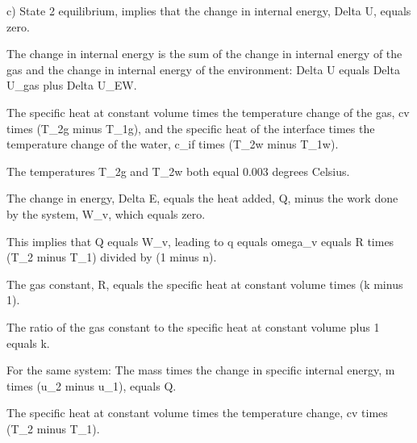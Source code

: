 c) State 2 equilibrium, implies that the change in internal energy, Delta U, equals zero.

The change in internal energy is the sum of the change in internal energy of the gas and the change in internal energy of the environment:
Delta U equals Delta U_gas plus Delta U_EW.

The specific heat at constant volume times the temperature change of the gas, cv times (T_2g minus T_1g), and the specific heat of the interface times the temperature change of the water, c_if times (T_2w minus T_1w).

The temperatures T_2g and T_2w both equal 0.003 degrees Celsius.

The change in energy, Delta E, equals the heat added, Q, minus the work done by the system, W_v, which equals zero.

This implies that Q equals W_v, leading to q equals omega_v equals R times (T_2 minus T_1) divided by (1 minus n).

The gas constant, R, equals the specific heat at constant volume times (k minus 1).

The ratio of the gas constant to the specific heat at constant volume plus 1 equals k.

For the same system:
The mass times the change in specific internal energy, m times (u_2 minus u_1), equals Q.

The specific heat at constant volume times the temperature change, cv times (T_2 minus T_1).